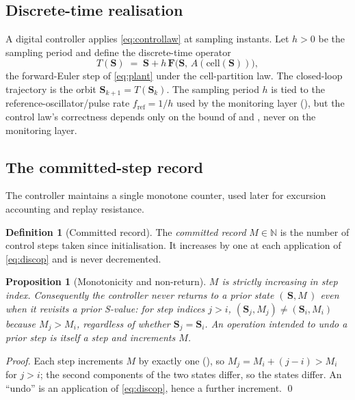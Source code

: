 \documentclass[11pt,a4paper,twocolumn]{article}
\theoremstyle{thmstyle}
\newtheorem{proposition}[theorem]{Proposition}
\theoremstyle{definition}
\newtheorem{definition}[theorem]{Definition}
\theoremstyle{remark}
\newcommand{\N}{\mathbb{N}}
\newcommand{\Ss}{\mathbf{S}}
\newcommand{\fref}{f_{\mathrm{ref}}}
\begin{document}
\subsection{Discrete-time realisation}

A digital controller applies \eqref{eq:controllaw} at sampling instants.
Let $h>0$ be the sampling period and define the discrete-time operator
\begin{equation}
\label{eq:discop}
T(\Ss)\;=\;\Ss+h\,\mathbf F\bigl(\Ss,\,A(\mathrm{cell}(\Ss))\bigr),
\end{equation}
the forward-Euler step of \eqref{eq:plant} under the cell-partition law.
The closed-loop trajectory is the orbit $\Ss_{k+1}=T(\Ss_k)$. The
sampling period $h$ is tied to the reference-oscillator/pulse rate
$\fref=1/h$ used by the monitoring layer (), but the
control law's correctness depends only on the bound of
 and , never on the monitoring layer.

\subsection{The committed-step record}

The controller maintains a single monotone counter, used later for
excursion accounting and replay resistance.

\begin{definition}[Committed record]
\label{def:record}
The \emph{committed record} $M\in\N$ is the number of control steps taken
since initialisation. It increases by one at each application of
\eqref{eq:discop} and is never decremented.
\end{definition}

\begin{proposition}[Monotonicity and non-return]
\label{prop:monotone}
$M$ is strictly increasing in step index. Consequently the controller
never returns to a prior \emph{state} $(\,\Ss,M\,)$ even when it revisits
a prior S-value: for step indices $j>i$, $(\Ss_j,M_j)\neq(\Ss_i,M_i)$
because $M_j>M_i$, regardless of whether $\Ss_j=\Ss_i$. An operation
intended to undo a prior step is itself a step and increments $M$.
\end{proposition}

\begin{proof}
Each step increments $M$ by exactly one (), so
$M_j=M_i+(j-i)>M_i$ for $j>i$; the second components of the two states
differ, so the states differ. An ``undo'' is an application of
\eqref{eq:discop}, hence a further increment. \qed
\end{proof}
\end{document}
